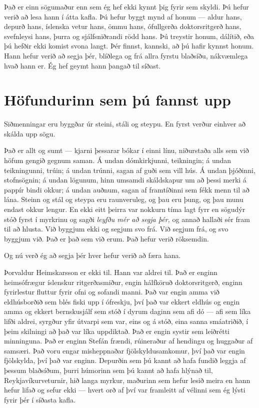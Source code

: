 Það er einn sögumaður enn sem ég hef ekki kynnt þig fyrir sem skyldi. Þú hefur verið að lesa hann í átta kafla. Þú hefur byggt mynd af honum — aldur hans, depurð hans, íslenska vetur hans, ömmu hans, ófullgerða doktorsritgerð hans, svefnleysi hans, þurra og sjálfsniðrandi rödd hans. Þú treystir honum, dálítið, eða þú hefðir ekki komist svona langt. Þér finnst, kannski, að þú hafir kynnst honum. Hann hefur verið að segja þér, blíðlega og frá allra fyrstu blaðsíðu, nákvæmlega hvað hann er. Ég hef geymt hann þangað til síðast.

\chapter{Höfundurinn sem þú fannst upp}

Siðmenningar eru byggðar úr steini, stáli og steypu. En fyrst verður einhver að skálda upp sögu.

Það er allt og sumt — kjarni þessarar bókar í einni línu, niðurstaða alls sem við höfum gengið gegnum saman. Á undan dómkirkjunni, teikningin; á undan teikningunni, trúin; á undan trúnni, sagan af guði sem vill hús. Á undan þjóðinni, stofnsögnin; á undan lögunum, hinn umsamdi skáldskapur um að þessi merki á pappír bindi okkur; á undan auðnum, sagan af framtíðinni sem fékk menn til að lána. Steinn og stál og steypa eru raunveruleg, og þau eru þung, og þau munu endast okkur lengur. En ekki eitt þeirra var nokkurn tíma lagt fyrr en sögudýr stóð fyrst í myrkrinu og sagði \emph{leyfðu mér að segja þér,} og annað hallaði sér fram til að hlusta. Við byggjum ekki og segjum svo frá. Við segjum frá, og svo byggjum við. Það er það sem við erum. Það hefur verið röksemdin.

Og nú verð ég að segja þér hver hefur verið að færa hana.

Þorvaldur Heimskarsson er ekki til. Hann var aldrei til. Það er enginn heimsófrægur íslenskur ritgerðasmiður, engin hálfköruð doktorsritgerð, enginn fyrirlestur fluttur fyrir ofni og sofandi manni. Það var engin amma við eldhúsborðið sem blés fiski upp í ófreskju, því það var ekkert eldhús og engin amma og ekkert bernskusjálf sem stóð í dyrum daginn sem afi dó — afi sem líka lifði aldrei, syrgður yfir útvarpi sem var, eins og á stóð, eina sanna smáatriðið, í þeim skilningi að það var líka uppdiktað. Það er engin systir sem leiðrétti minninguna. Það er enginn Stefán frændi, rúineraður af hendingu og huggaður af samsæri. Það voru engar misheppnaðar fjölskyldusamkomur, því það var engin fjölskylda, því það var enginn. Depurðin sem þú kannt að hafa fundið leggja af þessum blaðsíðum, þurri húmorinn sem þú kannt að hafa hlýnað til, Reykjavíkurveturnir, hið langa myrkur, maðurinn sem hefur lesið meira en hann hefur lifað og sefur ekki — hvert orð af því var framleitt af vélinni sem ég lýsti fyrir þér í síðasta kafla.

